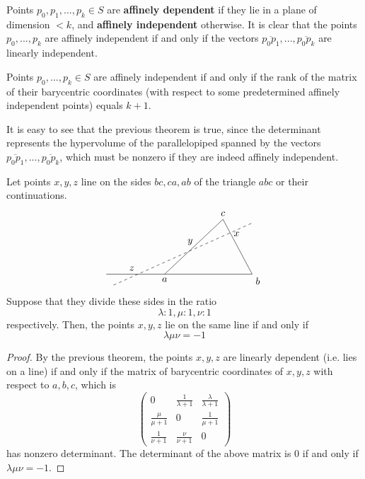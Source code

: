   \begin{definition}
    Points $p_0, p_1, ..., p_k \in S$ are \textbf{affinely dependent} if they lie in a plane of dimension $<k$, and \textbf{affinely independent} otherwise. It is clear that the points $p_0,..., p_k$ are affinely independent if and only if the vectors $\overline{p_0p_1}, ..., \overline{p_0 p_k}$ are linearly independent. 
  \end{definition}

  \begin{theorem}
    Points $p_0, ..., p_k \in S$ are affinely independent if and only if the rank of the matrix of their barycentric coordinates (with respect to some predetermined affinely independent points) equals $k+1$. 
  \end{theorem}

  It is easy to see that the previous theorem is true, since the determinant represents the hypervolume of the parallelopiped spanned by the vectors $\overline{p_0p_1}, ..., \overline{p_0 p_k}$, which must be nonzero if they are indeed affinely independent. 

  \begin{corollary}
    Let points $x, y, z$ line on the sides $bc, ca, ab$ of the triangle $abc$ or their continuations. 
    \[\begin{tikzpicture}[scale=1.3]
      \draw (-1,0)--(3,0)--(2.2, 1.5)--(0.6,0);
      \node[below] at (0.6, 0) {$a$};
      \node[below right] at (3,0) {$b$};
      \node[above] at (2.2, 1.5) {$c$};
      \draw[dashed] (-0.8,-0.3)--(3,1.4);
      \node[above] at (-0.3, 0) {$z$};
      \node[above] at (1.3, 0.7) {$y$};
      \node[right] at (2.4, 1.1) {$x$};
    \end{tikzpicture}\]
    Suppose that they divide these sides in the ratio 
    \[\lambda: 1, \mu: 1, \nu: 1\]
    respectively. Then, the points $x, y, z$ lie on the same line if and only if 
    \[\lambda \mu \nu = -1\]
  \end{corollary}
  \begin{proof}
  By the previous theorem, the points $x, y, z$ are linearly dependent (i.e. lies on a line) if and only if the matrix of barycentric coordinates of $x, y, z$ with respect to $a, b, c$, which is
  \begin{equation}
    \begin{pmatrix}
    0 & \frac{1}{\lambda + 1} & \frac{\lambda}{\lambda + 1} \\
    \frac{\mu}{\mu + 1} & 0 & \frac{1}{\mu + 1} \\
    \frac{1}{\nu + 1} & \frac{\nu}{\nu+1} & 0
    \end{pmatrix}
  \end{equation}
  has nonzero determinant. The determinant of the above matrix is $0$ if and only if $\lambda \mu \nu = -1$. 
  \end{proof}

